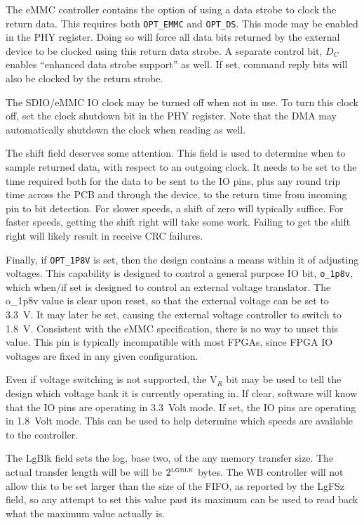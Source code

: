 \documentclass{gqtekspec}
\begin{document}
The eMMC controller contains the option of using a data strobe to clock
the return data.  This requires both {\tt OPT\_EMMC} and {\tt OPT\_DS}.  This
mode may be enabled in the PHY register.  Doing so will force all data bits
returned by the external device to be clocked using this return data strobe.
A separate control bit, $D_C$ enables ``enhanced data strobe support'' as
well.  If set, command reply bits will also be clocked by the return strobe.

The SDIO/eMMC IO clock may be turned off when not in use.  To turn this clock
off, set the clock shutdown bit in the PHY register.  Note that the DMA may
automatically shutdown the clock when reading as well.

The shift field deserves some attention.  This field is used to determine
when to sample returned data, with respect to an outgoing clock.  It needs to
be set to the time required both for the data to be sent to the IO pins, plus
any round trip time across the PCB and through the device, to the return
time from incoming pin to bit detection.  For slower speeds, a shift of zero
will typically suffice.  For faster speeds, getting the shift right will take
some work.  Failing to get the shift right will likely result in receive CRC
failures.

Finally, if {\tt OPT\_1P8V} is set, then the design contains a means within it
of adjusting voltages.  This capability is designed to control a general
purpose IO bit, {\tt o\_1p8v}, which when/if set is designed to control an
external voltage translator.  The {o\_1p8v} value is clear upon reset, so that
the external voltage can be set to 3.3~V.  It may later be set, causing the
external voltage controller to switch to 1.8~V.  Consistent with the eMMC
specification, there is no way to unset this value.  This pin is typically
incompatible with most FPGAs, since FPGA IO voltages are fixed in any given
configuration.

Even if voltage switching is not supported, the V$_R$ bit may be used to tell
the design which voltage bank it is currently operating in.  If clear,
software will know that the IO pins are operating in 3.3~Volt mode.  If set,
the IO pins are operating in 1.8~Volt mode.  This can be used to help
determine which speeds are available to the controller.

The LgBlk field sets the log, base two, of the any memory transfer size.  The
actual transfer length will be will be $2^{\mbox{\tiny LGBLK}}$ bytes.  The
WB controller will not allow this to be set larger than the size of the FIFO,
as reported by the LgFSz field, so any attempt to set this value past its
maximum can be used to read back what the maximum value actually is.
\end{document}
